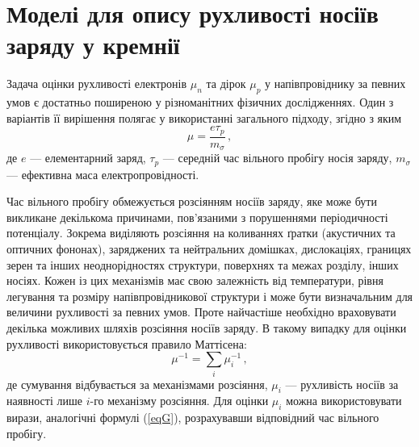 \documentclass[10pt,a5paper,titlepage,oneside]{book}
\numberwithin{equation}{part}
\begin{document}

\renewcommand\bibname{Список використаних джерел}
\renewcommand{\tablename}{Табл.}

\setcounter{chapter}{1}
\setcounter{section}{1}

\section{Моделі для опису рухливості носіїв заряду у кремнії}\label{Teor}

Задача оцінки рухливості електронів $\mu_n$ та дірок $\mu_p$ у напівпровіднику
за певних умов є достатньо поширеною у різноманітних фізичних дослідженнях.
Один з варіантів її вирішення полягає у використанні загального підходу, згідно з яким
\begin{equation}\label{eqG}
  \mu=\frac{e\tau_p}{m_\sigma}\,,
\end{equation}
де
$e$ --- елементарний заряд,
$\tau_p$ --- середній час вільного пробігу носія заряду,
$m_\sigma$ --- ефективна маса електропровідності.

Час вільного пробігу обмежується розсіянням носіїв заряду, яке може бути викликане декількома причинами,
пов'язаними з порушеннями періодичності потенціалу.
Зокрема виділяють розсіяння на коливаннях ґратки (акустичних та оптичних фононах), заряджених та нейтральних домішках,
дислокаціях, границях зерен та інших неоднорідностях структури, поверхнях та межах розділу, інших носіях.
Кожен із цих механізмів має свою залежність від температури, рівня легування та розміру напівпровідникової структури
і може бути визначальним для величини рухливості за певних умов.
Проте найчастіше необхідно враховувати декілька можливих шляхів розсіяння носіїв заряду.
В такому випадку для оцінки рухливості використовується правило Маттісена:
\begin{equation}\label{eqM}
  \mu^{-1}=\sum_i \mu_i^{-1}\,,
\end{equation}
де
сумування відбувається за механізмами розсіяння,
$\mu_i$ --- рухливість носіїв за наявності лише $i$-го механізму розсіяння.
Для оцінки $\mu_i$ можна використовувати вирази, аналогічні формулі (\ref{eqG}), розрахувавши відповідний час вільного пробігу.
\end{document}
